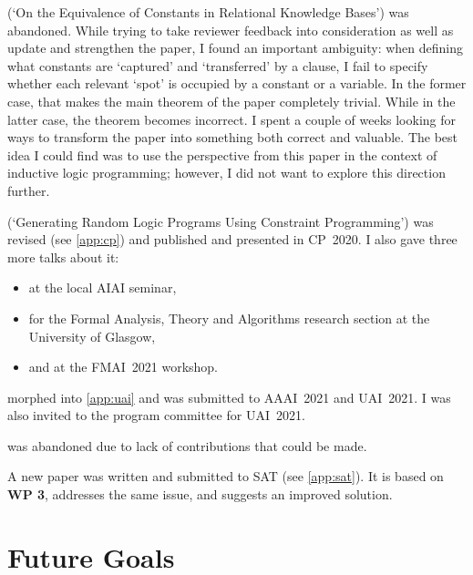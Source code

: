 \documentclass{article}
\begin{document}
\begin{description}
\item[WP 1] (`On the Equivalence of Constants in Relational Knowledge Bases')
  was abandoned. While trying to take reviewer feedback into consideration as
  well as update and strengthen the paper, I found an important ambiguity: when
  defining what constants are `captured' and `transferred' by a clause, I fail
  to specify whether each relevant `spot' is occupied by a constant or a
  variable. In the former case, that makes the main theorem of the paper
  completely trivial. While in the latter case, the theorem becomes incorrect. I
  spent a couple of weeks looking for ways to transform the paper into something
  both correct and valuable. The best idea I could find was to use the
  perspective from this paper in the context of inductive logic programming;
  however, I did not want to explore this direction further.
\item[WP 2] (`Generating Random Logic Programs Using Constraint
  Programming') was revised (see \cref{app:cp}) and published and presented in
  CP~2020. I also gave three more talks about it: %
  \begin{itemize}
  \item at the local AIAI seminar,
  \item for the Formal Analysis, Theory and Algorithms research section at the
    University of Glasgow,
  \item and at the FMAI~2021 workshop.
  \end{itemize}
\item[WP 3] morphed into \cref{app:uai} and was submitted to AAAI~2021 and
  UAI~2021. I was also invited to the program committee for UAI~2021.
\item[WP 4] was abandoned due to lack of contributions that could be made. %
\item A new paper was written and submitted to SAT (see \cref{app:sat}). It is
  based on \textbf{WP 3}, addresses the same issue, and suggests an improved
  solution.
\end{description}


\section{Future Goals}
\end{document}
